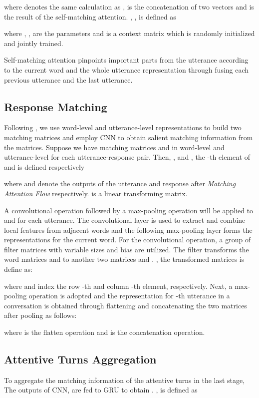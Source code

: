 \documentclass[11pt]{article}
\begin{document}
where  denotes the same calculation as ,  is the concatenation of two vectors and  is the result of the self-matching attention. , ,  is defined as 

where , ,  are the parameters and  is a context matrix which is randomly initialized and jointly trained.

Self-matching attention pinpoints important parts from the utterance according to the current word and the whole utterance representation through fusing each previous utterance and the last utterance.

\subsection{Response Matching}

Following \cite{Wu2016Sequential}, we use word-level and utterance-level representations to build two matching matrices and employ CNN to obtain salient matching information from the matrices. Suppose we have matching matrices  and  in word-level and utterance-level for each utterance-response pair. Then, ,  and , the -th element of  and  is defined respectively



where  and  denote the outputs of the utterance and response after \emph{Matching Attention Flow} respectively.   is a linear transforming matrix.

A convolutional operation followed by a max-pooling operation will be applied to  and  for each utterance. The convolutional layer is used to extract and combine local features from adjacent words and the following max-pooling layer forms the representations for the current word. For the convolutional operation, a group of filter matrices  with variable sizes  and bias  are utilized. The filter transforms the word matrices  and  to another two matrices  and .  , the transformed matrices  is define as:


where  and  index the row -th and column -th element, respectively. Next, a max-pooling operation is adopted and the representation  for -th utterance in a conversation is obtained through flattening and  concatenating the two matrices after pooling as follows:



where  is the flatten operation and  is the concatenation operation.

\subsection{Attentive Turns Aggregation}
To aggregate the matching information of the attentive turns in the last stage, The outputs of CNN,  are fed to GRU to obtain . ,  is defined as 
\end{document}
